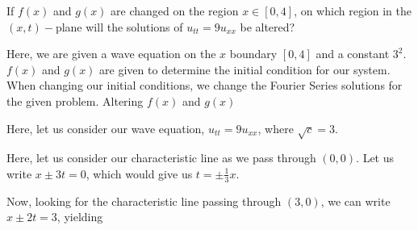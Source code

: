 \item If $f(x)$ and $g(x)$ are changed on the region $x \in [0, 4]$, on which region in the $(x, t)-$plane will the solutions of $u_{tt} = 9u_{xx}$ be altered?

Here, we are given a wave equation on the $x$ boundary $[0, 4]$ and a constant $3^2$. $f(x)$ and $g(x)$ are given to determine the initial condition for our system. When changing our initial conditions, we change the Fourier Series solutions for the given problem. Altering $f(x)$ and $g(x)$

Here, let us consider our wave equation, $u_{tt} = 9u_{xx}$, where $\sqrt{c} = 3$.

Here, let us consider our characteristic line as we pass through $(0,0)$. Let us write $x \pm 3t = 0$, which would give us $t = \pm \frac{1}{3} x$.

Now, looking for the characteristic line passing through $(3, 0)$, we can write $x \pm 2t = 3$, yielding
